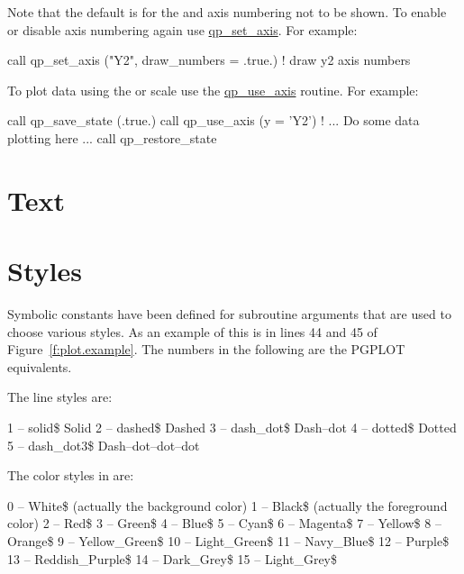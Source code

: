 Note that the default is for the  and  axis numbering
not to be shown. To enable or disable axis numbering again use
\hyperref[r:qp.set.axis]{qp_set_axis}. For example:
\begin{example}
  call qp_set_axis ("Y2", draw_numbers = .true.)  ! draw y2 axis numbers
\end{example}

To plot data using the  or  scale use the
\hyperref[r:qp.use.axis]{qp_use_axis} routine. For example:
\begin{example}
  call qp_save_state (.true.)
  call qp_use_axis (y = 'Y2')
  ! ... Do some data plotting here ...
  call qp_restore_state
\end{example}

\section{Text}
\label{s:text}



\section{Styles}
\label{s:styles}

Symbolic constants have been defined for \quickplot subroutine
arguments that are used to choose various styles. As an example of
this is in lines 44 and 45 of Figure~\ref{f:plot.example}. The
numbers in the following are the PGPLOT equivalents.

The \quickplot line styles are:
\begin{example}
    1 -- solid\$                  Solid
    2 -- dashed\$                 Dashed
    3 -- dash_dot\$               Dash--dot 
    4 -- dotted\$                 Dotted
    5 -- dash_dot3\$              Dash--dot--dot--dot        
\end{example}

The color styles in \quickplot are:
\begin{example}
    0 -- White\$   (actually the background color)
    1 -- Black\$   (actually the foreground color)
    2 -- Red\$
    3 -- Green\$
    4 -- Blue\$
    5 -- Cyan\$
    6 -- Magenta\$
    7 -- Yellow\$ 
    8 -- Orange\$
    9 -- Yellow_Green\$
   10 -- Light_Green\$
   11 -- Navy_Blue\$
   12 -- Purple\$
   13 -- Reddish_Purple\$
   14 -- Dark_Grey\$
   15 -- Light_Grey\$
\end{example}

